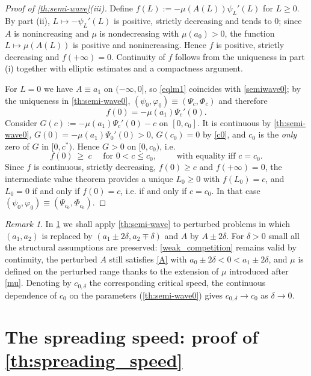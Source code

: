 \documentclass[reqno]{amsart}
\theoremstyle{plain}
\theoremstyle{definition}
\theoremstyle{remark}
\newtheorem{remark}{Remark}
\begin{document}
\begin{proof}[Proof of \cref{th:semi-wave}(iii)]
	Define $f(L):=-\mu(A(L))\psi_L'(L)$ for $L\ge0$. By part (ii), $L\mapsto
	-\psi_L'(L)$ is positive, strictly decreasing and tends to $0$; since $A$ is
	nonincreasing and $\mu$ is nondecreasing with $\mu(a_0)>0$, the function
	$L\mapsto\mu(A(L))$ is positive and nonincreasing. Hence $f$ is positive,
	strictly decreasing and $f(+\infty)=0$. Continuity of $f$ follows from the
	uniqueness in part (i) together with elliptic estimates and a compactness
	argument.

	For $L=0$ we have $A\equiv a_1$ on $(-\infty,0]$, so \eqref{eqlm1} coincides
	with \eqref{semiwave0}; by the uniqueness in \cref{th:semi-wave0},
	$(\psi_0,\varphi_0)\equiv(\Psi_c,\Phi_c)$ and therefore
	\[
	f(0)=-\mu(a_1)\Psi_c'(0).
	\]
	Consider $G(c):=-\mu(a_1)\Psi_c'(0)-c$ on $[0,c_0]$. It is continuous by
	\cref{th:semi-wave0}, $G(0)=-\mu(a_1)\Psi_0'(0)>0$, $G(c_0)=0$ by \eqref{c0},
	and $c_0$ is the \emph{only} zero of $G$ in $[0,c^*)$. Hence $G>0$ on
	$[0,c_0)$, i.e.
	\[
	f(0)\ \ge\ c \quad\text{ for } 0<c\le c_0,\qquad\text{ with equality iff } c=c_0 .
	\]
	Since $f$ is continuous, strictly decreasing, $f(0)\ge c$ and $f(+\infty)=0$,
	the intermediate value theorem provides a unique $L_0\ge0$ with $f(L_0)=c$,
	and $L_0=0$ if and only if $f(0)=c$, i.e. if and only if $c=c_0$. In that case
	$(\psi_0,\varphi_0)\equiv(\Psi_{c_0},\Phi_{c_0})$.
\end{proof}

\begin{remark}\label{rm:perturbed}
	In \cref{sec_6} we shall apply \cref{th:semi-wave} to perturbed problems in
	which $(a_1,a_2)$ is replaced by $(a_1\pm2\delta,a_2\mp\delta)$ and $A$ by
	$A\pm2\delta$. For $\delta>0$ small all the structural assumptions are
	preserved: \eqref{weak_competition} remains valid by continuity, the
	perturbed $A$ still satisfies \eqref{A} with $a_0\pm2\delta<0<a_1\pm2\delta$,
	and $\mu$ is defined on the perturbed range thanks to the extension of $\mu$
	introduced after \eqref{mu}. Denoting by $c_{0,\delta}$ the corresponding
	critical speed, the continuous dependence of $c_0$ on the parameters
	(\cref{th:semi-wave0}) gives $c_{0,\delta}\to c_0$ as $\delta\to0$.
\end{remark}

\section{The spreading speed: proof of \texorpdfstring{\cref{th:spreading_speed}}{the spreading speed theorem}}\label{sec_6}
\end{document}
